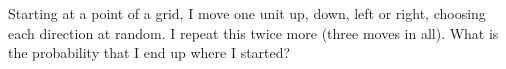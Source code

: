 Starting at a point of a grid, I move one unit up, down, left or right, choosing each direction at random. I repeat this twice more (three moves in all). What is the probability that I end up where I started?
